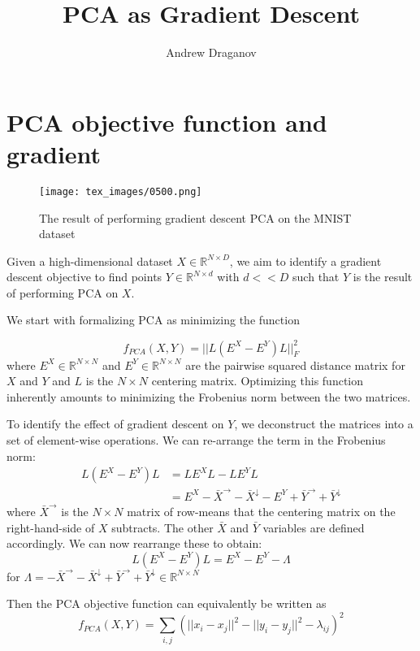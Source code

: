 \documentclass{article}
\title{PCA as Gradient Descent}
\author{Andrew Draganov}
\theoremstyle{definition}
\begin{document}
\maketitle
\section{PCA objective function and gradient}

\begin{figure}
\centering
\texttt{[image: tex\_images/0500.png]}
\caption{The result of performing gradient descent PCA on the MNIST dataset}
\end{figure}

Given a high-dimensional dataset $X \in \mathbb{R}^{N \times D}$, we aim to identify a gradient descent objective to find points $Y \in \mathbb{R}^{N \times d}$
with $d << D$ such that $Y$ is the result of performing PCA on $X$.

We start with formalizing PCA as minimizing the function

\begin{equation}
    f_{PCA}(X, Y) = ||L (E^X - E^Y) L ||^2_F
\end{equation}
where $E^X \in \mathbb{R}^{N \times N}$ and $E^Y \in \mathbb{R}^{N \times N}$ are the pairwise squared distance matrix for $X$ and $Y$ and $L$ is the $N \times N$ centering matrix. Optimizing this function inherently
amounts to minimizing the Frobenius norm between the two matrices.

To identify the effect of gradient descent on $Y$, we deconstruct the matrices into a set of element-wise operations. We can re-arrange the term in the
Frobenius norm:
\begin{align*}
    L (E^X - E^Y) L &= LE^XL - LE^YL \\
    &= E^X - \bar{X}^{\rightarrow} - \bar{X}^{\downarrow} - E^Y + \bar{Y}^{\rightarrow} + \bar{Y}^{\downarrow}
\end{align*}
where $\bar{X}^{\rightarrow}$ is the $N \times N$ matrix of row-means that the centering matrix on the right-hand-side of $X$ subtracts. The other $\bar{X}$ and
$\bar{Y}$ variables are defined accordingly. We can now rearrange these to obtain:
\[ L (E^X - E^Y) L = E^X - E^Y - \Lambda \]
for $\Lambda = - \bar{X}^{\rightarrow} - \bar{X}^{\downarrow} + \bar{Y}^{\rightarrow} + \bar{Y}^{\downarrow} \in \mathbb{R}^{N \times N}$

Then the PCA objective function can equivalently be written as
\begin{equation}
    f_{PCA}(X, Y) = \sum_{i, j} \left( ||x_i - x_j||^2 - ||y_i - y_j||^2 - \lambda_{ij} \right) ^2
\end{equation}
\end{document}
